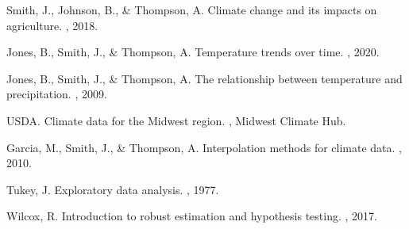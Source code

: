 \documentclass{article}
\begin{document}
\begin{thebibliography}{10}
Smith, J., Johnson, B., \& Thompson, A.
\newblock Climate change and its impacts on agriculture.
, 2018.

Jones, B., Smith, J., \& Thompson, A.
\newblock Temperature trends over time.
, 2020.

Jones, B., Smith, J., \& Thompson, A.
\newblock The relationship between temperature and precipitation.
, 2009.

USDA.
\newblock Climate data for the Midwest region.
, Midwest Climate Hub.

Garcia, M., Smith, J., \& Thompson, A.
\newblock Interpolation methods for climate data.
, 2010.

Tukey, J.
\newblock Exploratory data analysis.
, 1977.

Wilcox, R.
\newblock Introduction to robust estimation and hypothesis testing.
, 2017.

\end{thebibliography}
\end{document}
